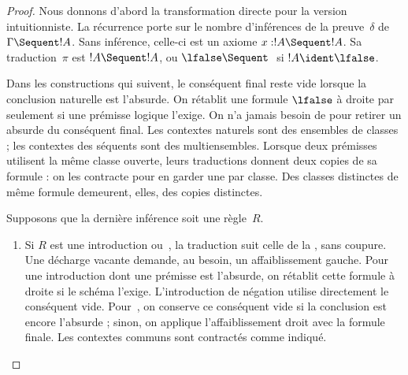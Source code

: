 \documentclass[../../../include/open-logic-section]{subfiles}
\begin{document}
\begin{proof}
Nous donnons d'abord la transformation
directe pour la version intuitionniste.
La récurrence porte sur le nombre
d'inférences de la preuve~$\delta$
de~$\Gamma \Sequent !A$.
Sans inférence, celle-ci est un axiome
$x:!A \Sequent !A$. Sa traduction~$\pi$
est $!A \Sequent !A$, ou
$\lfalse \Sequent \ $ si
$!A \ident \lfalse$.

Dans les constructions qui suivent,
le conséquent final reste vide lorsque
la conclusion naturelle est l'absurde.
On rétablit une formule $\lfalse$ à
droite par \RightR{\Weakening} seulement
si une prémisse logique l'exige.
On n'a jamais besoin de \Cut{} pour
retirer un absurde du conséquent final.
Les contextes naturels sont des ensembles
de classes ; les contextes des séquents
sont des multiensembles. Lorsque deux
prémisses utilisent la même classe
ouverte, leurs traductions donnent deux
copies de sa formule : on les contracte
pour en garder une par classe.
Des classes distinctes de même formule
demeurent, elles, des copies distinctes.

Supposons que la dernière inférence
soit une règle~$R$.
\begin{enumerate}
  \item Si $R$ est une introduction
  ou~\FalseInt, la traduction suit celle de la
  ,
  sans coupure. Une décharge vacante
  demande, au besoin, un affaiblissement
  gauche. Pour une introduction dont
  une prémisse est l'absurde, on rétablit
  cette formule à droite si le schéma
  l'exige. L'introduction de négation
  utilise directement le conséquent vide.
  Pour~\FalseInt, on conserve ce
  conséquent vide si la conclusion est
  encore l'absurde ; sinon, on applique
  l'affaiblissement droit avec la formule
  finale. Les contextes communs sont
  contractés comme indiqué.


\end{enumerate}
\end{proof}
\end{document}
